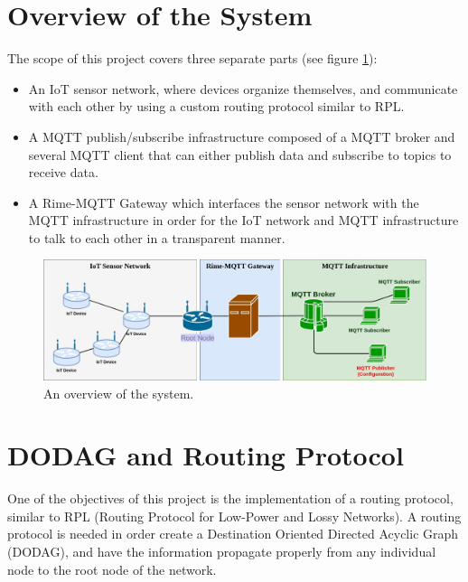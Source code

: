 \documentclass[a4paper,11pt]{article}
\begin{document}

\section{Overview of the System}
The scope of this project covers three separate parts (see figure \ref{fig:architecture1}):
\begin{itemize}
\item{An IoT sensor network, where devices organize themselves, and communicate with each other by using a custom routing protocol similar to RPL.}
\item{A MQTT publish/subscribe infrastructure composed of a MQTT broker and several MQTT client that can either publish data and subscribe to topics to receive data.}
\item{A Rime-MQTT Gateway which interfaces the sensor network with the MQTT infrastructure in order for the IoT network and MQTT infrastructure to talk to each other in a transparent manner.}
\end{itemize}

\begin{figure}
  \includegraphics[width=\linewidth]{img/architecture-2.jpg}
  \caption{An overview of the system.}
  \label{fig:architecture1}
\end{figure}
\section{DODAG and Routing Protocol}
One of the objectives of this project is the implementation of a routing protocol, similar to RPL (Routing Protocol for Low-Power and Lossy Networks). A routing protocol is needed in order create a Destination Oriented Directed Acyclic Graph (DODAG), and have the information propagate properly from any individual node to the root node of the network.\\
\end{document}
